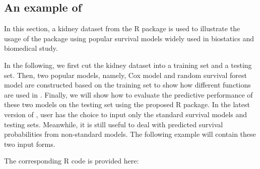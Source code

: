  \subsection{An example of }\label{sec3.2}

  In this section, a kidney dataset from the  R package is used to illustrate the usage of the  package using popular survival models widely used in biostatics and biomedical study.

  In the following, we first cut the kidney dataset into a training set and a testing set. Then, two popular models, namely, Cox model and random survival forest model are constructed based on the training set to show how different functions are used in . Finally, we will show how to evaluate the predictive performance of these two models on the testing set using the proposed  R package.  In the latest version of , user has the choice to input only the standard survival models and testing sets. Meanwhile, it is still useful to deal with predicted survival probabilities from non-standard models. The following example will contain these two input forms.

  The corresponding R code is provided here:


